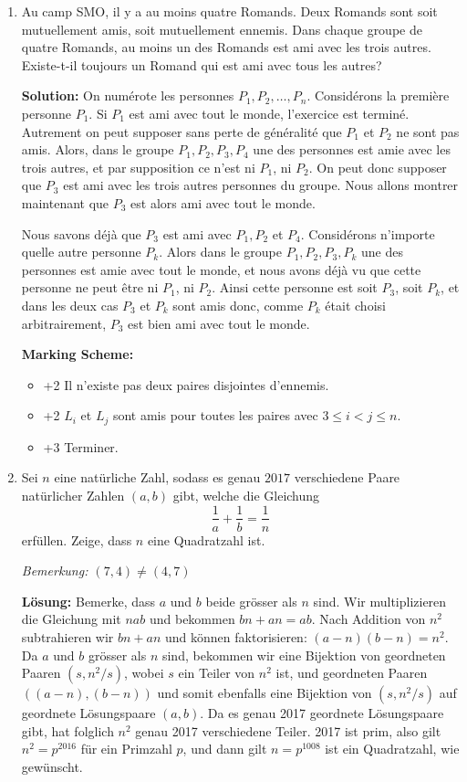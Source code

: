 \documentclass[language=german,style=solution]{smo}
\begin{document}
\begin{enumerate}[label=\textbf{\arabic*.}]
\newpage

\item Au camp SMO, il y a au moins quatre Romands. Deux Romands sont soit mutuellement amis, soit mutuellement ennemis. Dans chaque groupe de quatre Romands, au moins un des Romands est ami avec les trois autres. Existe-t-il toujours un Romand qui est ami avec tous les autres?

\textbf{Solution:} On numérote les personnes $P_1, P_2, \ldots, P_n$. Considérons la première personne $P_1$. Si $P_1$ est ami avec tout le monde, l'exercice est terminé. Autrement on peut supposer sans perte de généralité que $P_1$ et $P_2$ ne sont pas amis. Alors, dans le groupe $P_1, P_2, P_3, P_4$ une des personnes est amie avec les trois autres, et par supposition ce n'est ni $P_1$, ni $P_2$. On peut donc supposer que $P_3$ est ami avec les trois autres personnes du groupe. Nous allons montrer maintenant que $P_3$ est alors ami avec tout le monde.
	
Nous savons déjà que $P_3$ est ami avec $P_1, P_2$ et $P_4$. Considérons n'importe quelle autre personne $P_k$. Alors dans le groupe $P_1, P_2, P_3, P_k$ une des personnes est amie avec tout le monde, et nous avons déjà vu que cette personne ne peut être ni $P_1$, ni $P_2$. Ainsi cette personne est soit $P_3$, soit $P_k$, et dans les deux cas $P_3$ et $P_k$ sont amis donc, comme $P_k$ était choisi arbitrairement, $P_3$ est bien ami avec tout le monde.

\textbf{Marking Scheme:}
\begin{itemize}
	\item +2 Il n'existe pas deux paires disjointes d'ennemis.
	\item +2 $L_i$ et $L_j$ sont amis pour toutes les paires avec $3\leq i < j \leq n$.
	\item +3 Terminer.
\end{itemize}

\newpage

\item Sei $n$ eine natürliche Zahl, sodass es genau $2017$ verschiedene Paare natürlicher Zahlen $(a,b)$ gibt, welche die Gleichung
\[
 \frac{1}{a} + \frac{1}{b} = \frac{1}{n}
\]
erfüllen. Zeige, dass $n$ eine Quadratzahl ist.

\textit{Bemerkung: $(7,4) \neq (4,7)$}

\textbf{Lösung:}
Bemerke, dass $a$ und $b$ beide grösser als $n$ sind. Wir multiplizieren die Gleichung mit $nab$ und bekommen $bn+an=ab$. Nach Addition von $n^2$ subtrahieren wir $bn+an$ und können faktorisieren: $(a-n)(b-n)=n^2$. Da $a$ und $b$ grösser als $n$ sind, bekommen wir eine Bijektion von geordneten Paaren $(s,n^2/s)$, wobei $s$ ein Teiler von $n^2$ ist, und geordneten Paaren $((a-n),(b-n))$ und somit ebenfalls eine Bijektion von $(s,n^2/s)$ auf geordnete Lösungspaare $(a,b)$. Da es genau 2017 geordnete Lösungspaare gibt, hat folglich $n^2$ genau 2017 verschiedene Teiler. 2017 ist prim, also gilt $n^2 = p^{2016}$ für ein Primzahl $p$, und dann gilt $n = p^{1008}$ ist ein Quadratzahl, wie gewünscht.


\end{enumerate}
\end{document}
